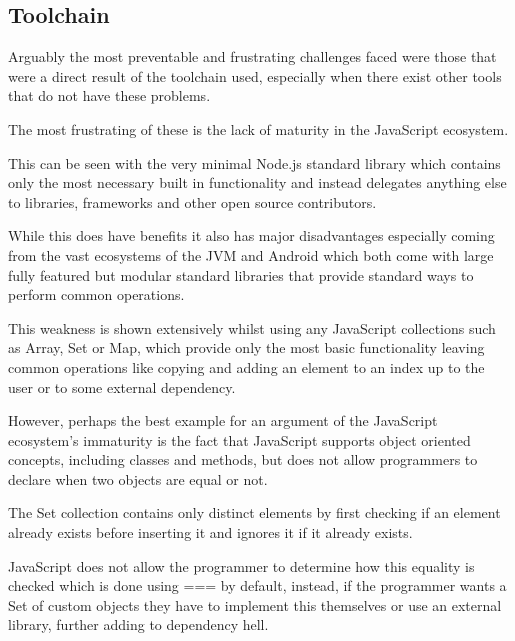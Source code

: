 \documentclass[12pt]{article}
\newcommand{\sentence}{} %
\begin{document}
    \subsection{Toolchain}\label{subsec:toolchain2}

    \tab
    Arguably the most preventable and frustrating challenges faced were those that were a direct result of the
    toolchain used, especially when there exist other tools that do not have these problems.
    \sentence
    The most frustrating of these is the lack of maturity in the JavaScript ecosystem.
    \sentence
    This can be seen with the very minimal Node.js standard library which contains only the most necessary built in
    functionality and instead delegates anything else to libraries, frameworks and other open source contributors.
    \sentence
    While this does have benefits it also has major disadvantages especially coming from the vast ecosystems of the
    JVM and Android which both come with large fully featured but modular standard libraries that provide standard
    ways to perform common operations.
    \sentence
    This weakness is shown extensively whilst using any JavaScript collections such as Array, Set or Map, which
    provide only the most basic functionality leaving common operations like copying and adding an element to an
    index up to the user or to some external dependency.
    \sentence
    However, perhaps the best example for an argument of the JavaScript ecosystem's immaturity is the fact that
    JavaScript supports object oriented concepts, including classes and methods, but does not allow programmers to
    declare when two objects are equal or not.
    \sentence
    The Set collection contains only distinct elements by first checking if an element already exists before
    inserting it and ignores it if it already exists.
    \sentence
    JavaScript does not allow the programmer to determine how this equality is checked which is done using === by
    default, instead, if the programmer wants a Set of custom objects they have to implement this themselves or
    use an external library, further adding to dependency hell.
    \sentence
\end{document}
